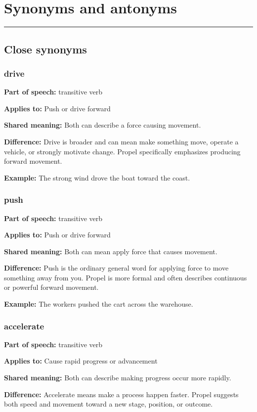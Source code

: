 \documentclass[11pt]{article}
\newcommand{\sectionrule}{\par\vspace{-0.5em}\noindent\textcolor{Accent}{\rule{\linewidth}{0.6pt}}\par}
\begin{document}
\section{Synonyms and antonyms}
\sectionrule
\subsection{Close synonyms}
\subsubsection{drive}
\textbf{Part of speech:} transitive verb

\textbf{Applies to:} Push or drive forward

\textbf{Shared meaning:} Both can describe a force causing movement.

\textbf{Difference:} Drive is broader and can mean make something move, operate a vehicle, or strongly motivate change. Propel specifically emphasizes producing forward movement.

\textbf{Example:} The strong wind drove the boat toward the coast.

\subsubsection{push}
\textbf{Part of speech:} transitive verb

\textbf{Applies to:} Push or drive forward

\textbf{Shared meaning:} Both can mean apply force that causes movement.

\textbf{Difference:} Push is the ordinary general word for applying force to move something away from you. Propel is more formal and often describes continuous or powerful forward movement.

\textbf{Example:} The workers pushed the cart across the warehouse.

\subsubsection{accelerate}
\textbf{Part of speech:} transitive verb

\textbf{Applies to:} Cause rapid progress or advancement

\textbf{Shared meaning:} Both can describe making progress occur more rapidly.

\textbf{Difference:} Accelerate means make a process happen faster. Propel suggests both speed and movement toward a new stage, position, or outcome.
\end{document}
